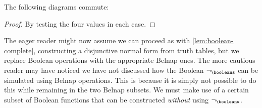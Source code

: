 \begin{lemma}\label{lem:belnap-bool-correspondence}
    The following diagrams commute:
    \begin{center}
        \quad

        \hspace{0.3em}
        \quad
    \end{center}
\end{lemma}
\begin{proof}
    By testing the four values in each case.
\end{proof}

The eager reader might now assume we can proceed as with
\cref{lem:boolean-complete},
constructing a disjunctive normal form from truth tables, but we replace Boolean
operations with the appropriate Belnap ones.
The more cautious reader may have noticed we have not discussed how the
Boolean \(\neg_\booleans\) can be simulated using Belnap operations.
This is because it is simply not possible to do this while remaining in the
two Belnap subsets.
We must make use of a certain subset of Boolean functions that can be
constructed \emph{without} using \(\neg_\booleans\).

